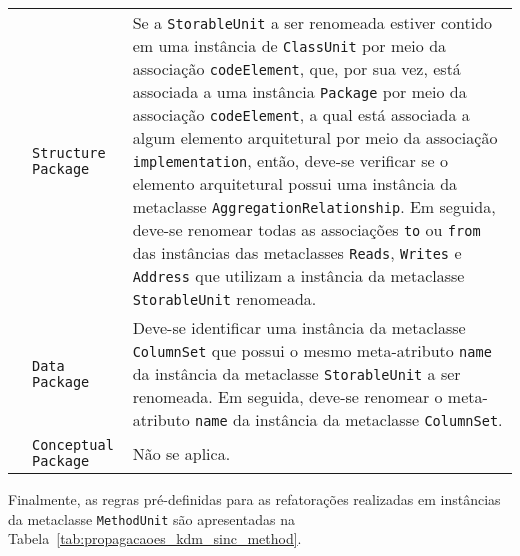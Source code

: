 \begin{longtable}{ | m{1.9cm} | m{3.57cm}| m{9.3cm} | }
\cline{2-3}
& \texttt{Structure Package} & Se a \texttt{StorableUnit} a ser renomeada estiver contido em uma instância de \texttt{ClassUnit} por meio da associação \texttt{codeElement}, que, por sua vez, está associada a uma instância \texttt{Package} por meio da associação \texttt{codeElement}, a qual está associada a algum elemento arquitetural por meio da associação \texttt{implementation}, então, deve-se verificar se o elemento arquitetural possui uma instância da metaclasse \texttt{AggregationRelationship}. Em seguida, deve-se renomear todas as associações \texttt{to} ou \texttt{from} das instâncias das metaclasses \texttt{Reads}, \texttt{Writes} e \texttt{Address} que utilizam a instância da metaclasse \texttt{StorableUnit} renomeada. \tabularnewline
\cline{2-3}
& \texttt{Data Package} & Deve-se identificar uma instância da metaclasse \texttt{ColumnSet} que possui o mesmo meta-atributo \texttt{name} da instância da metaclasse \texttt{StorableUnit} a ser renomeada. Em seguida, deve-se renomear o meta-atributo \texttt{name} da instância da metaclasse \texttt{ColumnSet}. \tabularnewline
\cline{2-3}
& \texttt{Conceptual Package} & Não se aplica. \tabularnewline
 \end{longtable}


Finalmente, as regras pré-definidas para as refatorações realizadas em instâncias da metaclasse \texttt{MethodUnit} são apresentadas na Tabela~\ref{tab:propagacaoes_kdm_sinc_method}.

